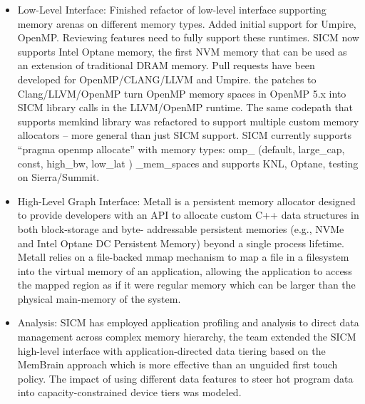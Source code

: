 \begin{itemize}
\item  Low-Level Interface: Finished refactor of low-level interface supporting memory arenas on different memory types. Added initial support for Umpire, OpenMP. Reviewing features need to fully support these runtimes. SICM now supports Intel Optane memory, the first NVM memory that can be used as an extension of traditional DRAM memory.
Pull requests have been developed for OpenMP/CLANG/LLVM and Umpire. the patches to Clang/LLVM/OpenMP turn OpenMP memory spaces in OpenMP 5.x into SICM library calls in the LLVM/OpenMP runtime. The same codepath that supports memkind library was refactored to support multiple custom memory allocators – more general than just SICM support.
SICM currently supports ``pragma openmp allocate'' with  memory types: omp\_ (default, large\_cap, const, high\_bw, low\_lat ) \_mem\_spaces and supports KNL, Optane, testing on Sierra/Summit.
\item  High-Level Graph Interface: Metall is a persistent memory allocator designed to provide developers with an API to allocate custom C++ data structures in both block-storage and byte- addressable persistent memories (e.g., NVMe and Intel Optane DC Persistent Memory) beyond a single process lifetime. Metall relies on a file-backed mmap mechanism to map a file in a filesystem into the virtual memory of an application, allowing the application to access the mapped region as if it were regular memory which can be larger than the physical main-memory of the system.
\item Analysis: 
SICM has employed application profiling and analysis to direct data management across complex memory hierarchy, the team extended the SICM high-level interface with application-directed data tiering based on the MemBrain approach which is more effective than an unguided first touch policy.  The impact of using different data features to steer hot program data into capacity-constrained device tiers was modeled.
\end{itemize}
